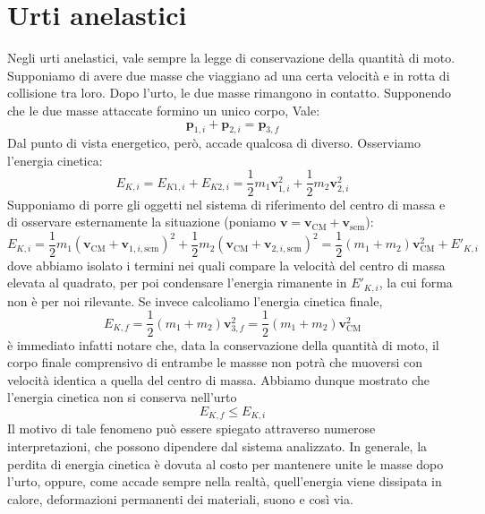 \section{Urti anelastici}
Negli urti anelastici, vale sempre la legge di conservazione della quantità
di moto. Supponiamo di avere due masse che viaggiano ad una certa velocità
e in rotta di collisione tra loro. Dopo l'urto, le due masse rimangono
in contatto. Supponendo che le due masse attaccate formino un unico corpo, Vale:
\[ \mathbf{p}_{1,i} + \mathbf{p}_{2,i} = \mathbf{p}_{3,f} \]
Dal punto di vista energetico, però, accade qualcosa di diverso. Osserviamo
l'energia cinetica:
\[ E_{K,i} = E_{K1, i} + E_{K2, i} = \frac12 m_1\mathbf{v}_{1,i}^2 + \frac12 m_2\mathbf{v}_{2,i}^2\]
Supponiamo di porre gli oggetti nel sistema di riferimento del centro di massa
e di osservare esternamente la situazione (poniamo $\mathbf{v} = \mathbf{v}_\text{CM} + \mathbf{v}_\text{scm}$):
\[ E_{K,i} = \frac12 m_1(\textbf{v}_\text{CM} + \mathbf{v}_{1,i,\text{scm}})^2 + \frac12 m_2(\textbf{v}_\text{CM} + \mathbf{v}_{2,i,\text{scm}})^2 = \frac12(m_1 + m_2)\mathbf{v}_\text{CM}^2 + E'_{K,i} \]
dove abbiamo isolato i termini nei quali compare la velocità del centro di massa
elevata al quadrato, per poi condensare l'energia rimanente in $E'_{K,i}$,
la cui forma non è per noi rilevante. Se invece calcoliamo l'energia cinetica
finale,
\[ E_{K,f} = \frac12 (m_1 + m_2)\mathbf{v}_{3,f}^2 = \frac12(m_1 + m_2)\mathbf{v}_\text{CM}^2 \]
è immediato infatti notare che, data la conservazione della quantità di moto,
il corpo finale comprensivo di entrambe le massse non potrà che muoversi
con velocità identica a quella del centro di massa.
Abbiamo dunque mostrato che l'energia cinetica non si conserva nell'urto
\[ E_{K,f} \leq E_{K,i} \]
Il motivo di tale fenomeno può essere spiegato attraverso numerose
interpretazioni, che possono dipendere dal sistema analizzato. In generale,
la perdita di energia cinetica è dovuta al costo per mantenere unite le
masse dopo l'urto, oppure, come accade sempre nella realtà, quell'energia
viene dissipata in calore, deformazioni permanenti dei materiali, suono e
così via.